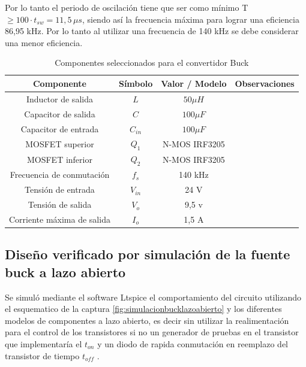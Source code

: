 \documentclass[]{article}
\begin{document}
Por lo tanto el periodo de oscilación tiene que ser como mínimo T $ \geq   100 \cdot t_{sw} = 11,5 \, \mu s$, siendo así la frecuencia máxima para lograr una eficiencia 86,95 kHz. Por lo tanto al utilizar una frecuencia de 140 kHz se debe considerar una menor eficiencia.

	
	
	\begin{table}[H]
		\centering
		\caption{Componentes seleccionados para el convertidor Buck}
		\renewcommand{\arraystretch}{1.5}
		\begin{tabular}{|c|c|c|c|}
			\hline
			\textbf{Componente} & \textbf{Símbolo} & \textbf{Valor / Modelo} & \textbf{Observaciones} \\
			\hline
			
			Inductor de salida & \(L\) & $50 \mu H $&  \\
			\hline
			
			Capacitor de salida & \(C\) & $100 \mu F$ &  \\
			\hline
			
			Capacitor de entrada & \(C_{in}\) & $100 \mu F$ &  \\
			\hline
			
			MOSFET superior & \(Q_1\) & N-MOS IRF3205  &  \\
			\hline
			
			MOSFET inferior & \(Q_2\) & N-MOS IRF3205  &  \\
			\hline
			
			Frecuencia de conmutación & \(f_s\) & 140 kHz&  \\
			\hline
			
			Tensión de entrada & \(V_{in}\) & 24 V &  \\
			\hline
			
			Tensión de salida & \(V_o\) & 9,5 v  &  \\
			\hline
			
			Corriente máxima de salida & \(I_o\) & 1,5 A &  \\
			\hline
			
		\end{tabular}
		\label{tab:componentes_buck}
	\end{table}
	
	
	\subsection{Diseño verificado por simulación de la fuente buck a lazo abierto}
	
	
	Se simuló mediante el software Ltspice el comportamiento del circuito utilizando el esquematico de la captura \ref{fig:simulacionbucklazoabierto} y los diferentes modelos de componentes a lazo abierto, es decir sin utilizar la realimentación para el control de los transistores si no un generador de pruebas en el transistor que implementaría el $t_{on}$ y un diodo de rapida conmutación en reemplazo del transistor de tiempo $t_{off}$ . 
	
\end{document}
